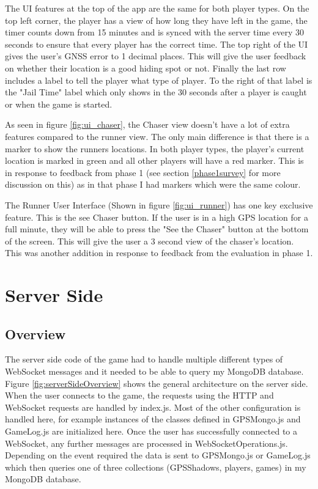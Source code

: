 \documentclass{l4proj}
\begin{document}
The UI features at the top of the app are the same for both player types. On the top
left corner, the player has a view of how long they have left in the game, the timer
counts down from 15 minutes and is synced with the server time every 30 seconds to 
ensure that every player has the correct time. The top right of the UI gives the
user's GNSS error to 1 decimal places. This will give the user feedback on whether
their location is a good hiding spot or not. Finally the last row includes a label
to tell the player what type of player. To the right of that label is the "Jail Time"
label which only shows in the 30 seconds after a player is caught or when the game is
started.

As seen in figure \ref{fig:ui_chaser}, the Chaser view doesn't have a lot of extra features
compared to the runner view. The only main difference is that there is a marker to show the
runners locations. In both player types, the player's current location is marked in green and
all other players will have a red marker. This is in response to feedback from phase 1 (see section
\ref{phase1survey} for more discussion on this) as in that phase I had markers which were the same
colour.

The Runner User Interface (Shown in figure \ref{fig:ui_runner}) has one key exclusive feature. This is the see Chaser button. If the user
is in a high GPS location for a full minute, they will be able to press the "See the Chaser" button
at the bottom of the screen. This will give the user a 3 second view of the chaser's location. This
was another addition in response to feedback from the evaluation in phase 1.

\section{Server Side}
\label{serverside_imp}

\subsection{Overview}
\label{serverOverview}
The server side code of the game had to handle multiple different types of WebSocket messages and it needed
to be able to query my MongoDB database. Figure \ref{fig:serverSideOverview} shows the general architecture
on the server side. When the user connects to the game, the requests using the HTTP and WebSocket requests
are handled by index.js. Most of the other configuration is handled here, for example instances of the classes
defined in GPSMongo.js and GameLog.js are initialized here. Once the user has successfully connected to a WebSocket,
any further messages are processed in WebSocketOperations.js. Depending on the event required the data is sent
to GPSMongo.js or GameLog.js which then queries one of three collections (GPSShadows, players, games) in my MongoDB database.
\end{document}
